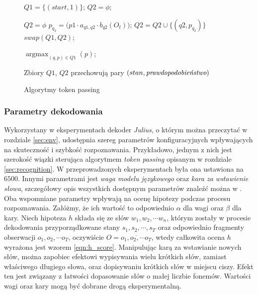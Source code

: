 \documentclass[shortabstract, mgr]{iithesis}
\DeclareMathOperator*{\argmax}{\arg\max}   %
\begin{document}
		    \begin{figure}
		    	\begin{algorithmic}[1]
		    		
		    		
		    		\STATE $Q1 = \{(start, 1)\}$; 
		    		\STATE $Q2 = \phi$;		    
		    		
			    		\STATE $Q2 = \phi$
					    		\STATE $p_{q_2} = \bigg( p1\cdot a_{q1,q2}\cdot b_{q2}(O_t) \label{line:b_q} \bigg)$;				    	
					    		\STATE $Q2 = Q2 \cup \{(q2, p_{q_2})\}$
				    		\ENDFOR
			    		\ENDFOR
			    		\STATE $swap(Q1, Q2)$;
		    		\ENDFOR
		    		
		    		\RETURN $\argmax_{(q,p)\in Q1}(p)$;
		    	\end{algorithmic}
	    	
		    	Zbiory $Q1$, $Q2$ przechowują pary $(stan, \textit{\text{prawdopodobieństwo}})$ 
		    	
		    	\caption{Algorytmy token passing}
		    	\label{alg:token_passing}
		    \end{figure}				   	
       

\subsubsection{Parametry dekodowania}
	\label{sec:meta_params}
	 	Wykorzystany w eksperymentach dekoder \textit{Julius}, o którym można przeczytać w rozdziale \ref{sec:env}, udostępnia szereg parametrów konfiguracyjnych wpływających na skuteczność i szybkość rozpoznawania. Przykładowo, jednym z nich jest szerokość wiązki sterująca algorytmem \textit{token passing} opisanym w rozdziale \ref{sec:recognition}. W przeprowadzonych eksperymentach była ona ustawiona na $6500$. Innymi parametrami jest \textit{waga modelu językowego} oraz \textit{kara za wstawienie słowa}, szczegółowy opis wszystkich dostępnym parametrów znaleźć można w \cite{juliusbook}. Oba wspomniane parametry wpływają na ocenę hipotezy podczas procesu rozpoznawania. Załóżmy, że ich wartość to odpowiednio $\alpha$ dla wagi oraz $\beta$ dla kary. Niech hipoteza $h$ składa się ze słów $w_1, w_2, \cdots w_n$, którym zostały w procesie dekodowania przyporządkowane stany $s_1,s_2,\cdots,s_T$ oraz odpowiednio fragmenty obserwacji $o_1, o_2, \cdots o_T$, oczywiście $O=\overline{o_1,o_2,\cdots o_T}$, wtedy całkowita ocena $h$ wyrażona jest wzorem \ref{eqn:h_score}. Manipulując karą za wstawianie nowych słów, można zapobiec efektowi wypisywania wielu krótkich słów, zamiast właściwego długiego słowa, oraz dopisywaniu krótkich słów w miejscu ciszy. Efekt ten jest związany z łatwości dopasowanie słów o małej liczbie fonemów.  Wartości wagi oraz kary mogą być dobrane drogą eksperymentalną.
	
\end{document}
